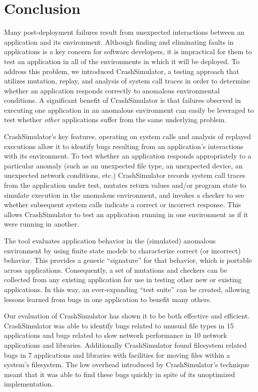 \section{Conclusion}

Many post-deployment failures result from
unexpected interactions between an application and its environment.
Although finding and eliminating faults in applications is a key concern for software developers, it is impractical for them to test an application in all of the
environments in which it will be deployed.
 To address this
problem, we introduced CrashSimulator, a testing
approach that utilizes mutation, replay, and analysis of system call traces
in order to determine whether an application responds correctly to
anomalous environmental conditions.
A significant benefit of CrashSimulator is that failures observed
in executing one application in an anomalous environment can
easily be leveraged to test whether {\em other} applications
suffer from the same underlying problem.

CrashSimulator's key features, operating on system calls and analysis of replayed executions allow it to identify bugs
resulting from an application's interactions with its environment.
To test whether an application responds appropriately to a particular
anomaly (such as an unexpected file type, an unexpected device, an unexpected
network conditions, etc.)
CrashSimulator records system call traces from the application under test,
mutates return values and/or program state to simulate execution in 
the anomalous environment, and invokes a checker to see whether
subsequent system calls indicate a correct or incorrect response.
This allows
CrashSimulator to test an application running in one environment
as if it were running in another.

The tool evaluates application behavior in the (simulated) anomalous environment
by using
finite state models to characterize correct (or incorrect) behavior.
This provides a generic ``signature'' for that behavior, which is
portable across applications. 
Consequently, a set of mutations and checkers can be collected from any existing
application for use in testing other new or existing applications. 
In this way, an ever-expanding ``test suite'' can
be created, allowing lessons learned from bugs in one application to benefit many
others.

Our evaluation of CrashSimulator has shown it to be both effective and
efficient.  CrashSimulator was able to identify bugs related to unusual file
types in 15 applications and bugs related to slow network performance in 10
network applications and libraries.  Additionally CrashSimulator found
filesystem related bugs in 7 applications and libraries with facilities for
moving files within a system's filesystem.  The low overhead
introduced by CrashSimulator's technique meant that it was able to
find these bugs quickly in spite of its unoptimized implementation.

